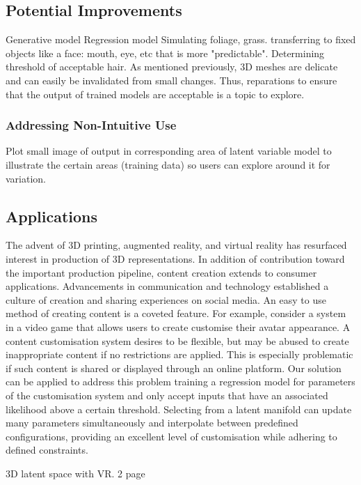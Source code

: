 \documentclass[ %
author={Dillon Keith Diep},
supervisor={Dr. Carl Henrik Ek},
degree={MEng},
title={ART-CG:},
subtitle={Assisted Real-time Content Generation of 3D Hair by Learning Manifolds},
type={Research},
year={2017} ]{dissertation}
\begin{document}
\subsection{Potential Improvements}
Generative model
Regression model
Simulating foliage, grass.
transferring to fixed objects like a face: mouth, eye, etc that is more "predictable".
Determining threshold of acceptable hair.
As mentioned previously, 3D meshes are delicate and can easily be invalidated from small changes. Thus, reparations to ensure that the output of trained models are acceptable is a topic to explore.

\subsubsection{Addressing Non-Intuitive Use}
Plot small image of output in corresponding area of latent variable model to illustrate the certain areas (training data) so users can explore around it for variation.

\subsection{Applications}
The advent of 3D printing, augmented reality, and virtual reality has resurfaced interest in production of 3D representations. In addition of contribution toward the important production pipeline, content creation extends to consumer applications. Advancements in communication and technology established a culture of creation and sharing experiences on social media. An easy to use method of creating content is a coveted feature.
For example, consider a system in a video game that allows users to create customise their avatar appearance. A content customisation system desires to be flexible, but may be abused to create inappropriate content if no restrictions are applied. This is especially problematic if such content is shared or displayed through an online platform. Our solution can be applied to address this problem training a regression model for parameters of the customisation system and only accept inputs that have an associated likelihood above a certain threshold. Selecting from a latent manifold can update many parameters simultaneously and interpolate between predefined configurations, providing an excellent level of customisation while adhering to defined constraints.

3D latent space with VR.
2 page
\end{document}
